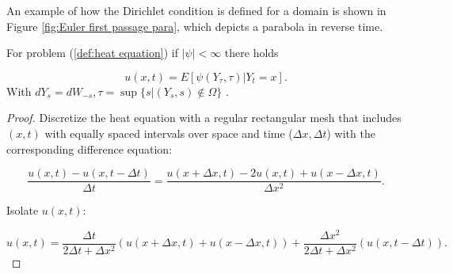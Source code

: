 \documentclass[a4paper,12pt]{article}
\begin{document}
An example of how the Dirichlet condition is defined for a domain is shown
in Figure \ref{fig:Euler first passage para}, which depicts a parabola
in reverse time.

\begin{lemma} \label{lem:BM HE}
    For problem (\ref{def:heat equation}) if $ |\psi|< \infty$
    there holds

    \begin{equation}
        u(x,t)=E[\psi(Y_{\tau},\tau) | Y_{t} =x].
    \end{equation}
    With $dY_{s} = dW_{-s},\tau = \sup\{s | (Y_{s},s) \notin \Omega\}$ .
\end{lemma}


\begin{proof} \label{proof: BM HE }
    Discretize the heat equation
    with a regular rectangular mesh that includes $(x,t)$ with equally
    spaced intervals over space and time ($\Delta x, \Delta t$) with
    the corresponding difference equation:

    \begin{equation}
        \frac{u(x,t)-u(x,t-\Delta t)}{\Delta t} = \frac{u(x + \Delta x,t)-2 u(x,t) +u(x - \Delta x,t)}{\Delta x^{2}} .
    \end{equation}

    Isolate $u(x,t)$:

    \begin{equation} \label{eq:discrete iso heat equation}
        u(x,t) =
        \frac{\Delta t}{ 2 \Delta t + \Delta x^{2}}
        \left(
        u(x+\Delta x,t)+u(x-\Delta x,t)
        \right) +
        \frac{\Delta x^{2}}{ 2 \Delta t + \Delta x^{2}}
        \left(
        u(x,t-\Delta t)
        \right).
    \end{equation}


\end{proof}
\end{document}
